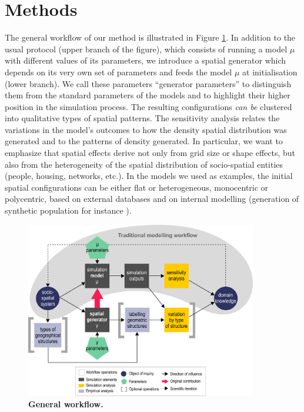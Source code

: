 \documentclass{JASSS}
\begin{document}
 




\section{Methods}

The general workflow of our method is illustrated in Figure \ref{fig:method}. In addition to the usual protocol (upper branch of the figure), which consists of running a model $\mu$ with different values of its parameters, we introduce a spatial generator which depends on its very own set of parameters and feeds the model $\mu$ at initialisation (lower branch). We call these parameters ``generator parameters'' to distinguish them from the standard parameters of the models and to highlight their higher position in the simulation process. The resulting configurations \emph{can be} clustered into qualitative types of spatial patterns. The sensitivity analysis relates the variations in the model's outcomes to how the density spatial distribution was generated and to the patterns of density generated. In particular, we want to emphasize that spatial effects derive not only from grid size or shape effects, but also from the heterogeneity of the spatial distribution of socio-spatial entities (people, housing, networks, etc.). In the models we used as examples, the initial spatial configurations can be either flat or heterogeneous, monocentric or polycentric, based on external databases and on internal modelling (generation of synthetic population for instance \citep{bhat1999activity}).
\begin{figure}[!t]
\centering
\includegraphics[width=0.9\textwidth]{figures/Fig1_v2.png}
\caption{\textbf{General workflow.}} \label{fig:method}
\end{figure} %
\end{document}
